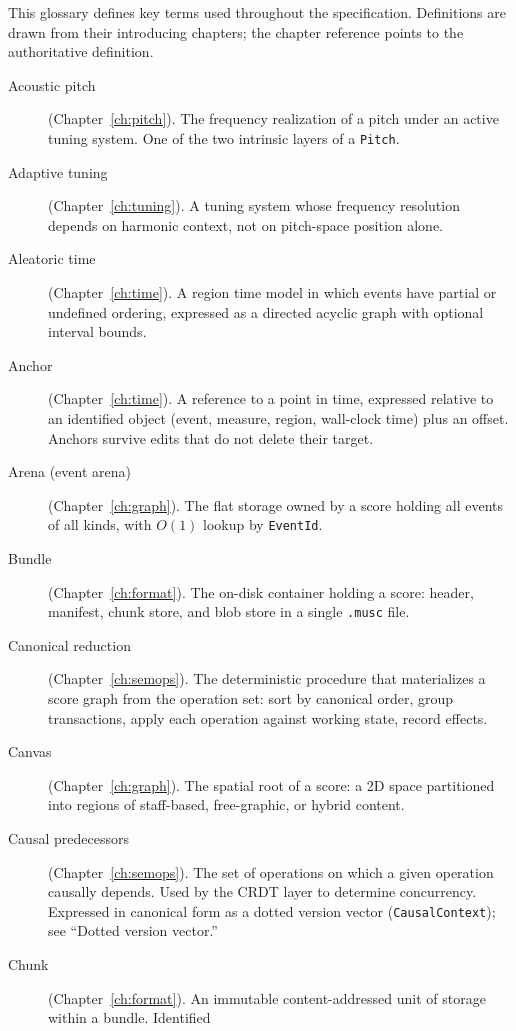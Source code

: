 \documentclass[11pt,letterpaper]{report}
\begin{document}
This glossary defines key terms used throughout the specification.
Definitions are drawn from their introducing chapters; the chapter
reference points to the authoritative definition.

\begin{description}
  \item[Acoustic pitch] (Chapter~\ref{ch:pitch}). The frequency
    realization of a pitch under an active tuning system. One of the
    two intrinsic layers of a \texttt{Pitch}.
  \item[Adaptive tuning] (Chapter~\ref{ch:tuning}). A tuning system
    whose frequency resolution depends on harmonic context, not on
    pitch-space position alone.
  \item[Aleatoric time] (Chapter~\ref{ch:time}). A region time model
    in which events have partial or undefined ordering, expressed
    as a directed acyclic graph with optional interval bounds.
  \item[Anchor] (Chapter~\ref{ch:time}). A reference to a point in
    time, expressed relative to an identified object (event,
    measure, region, wall-clock time) plus an offset. Anchors
    survive edits that do not delete their target.
  \item[Arena (event arena)] (Chapter~\ref{ch:graph}). The flat
    storage owned by a score holding all events of all kinds, with
    $O(1)$ lookup by \texttt{EventId}.
  \item[Bundle] (Chapter~\ref{ch:format}). The on-disk container
    holding a score: header, manifest, chunk store, and blob store
    in a single \texttt{.musc} file.
  \item[Canonical reduction] (Chapter~\ref{ch:semops}). The
    deterministic procedure that materializes a score graph from
    the operation set: sort by canonical order, group transactions,
    apply each operation against working state, record effects.
  \item[Canvas] (Chapter~\ref{ch:graph}). The spatial root of a
    score: a 2D space partitioned into regions of staff-based,
    free-graphic, or hybrid content.
  \item[Causal predecessors] (Chapter~\ref{ch:semops}). The set of
    operations on which a given operation causally depends. Used by
    the CRDT layer to determine concurrency. Expressed in canonical
    form as a dotted version vector
    (\texttt{CausalContext}); see ``Dotted version vector.''
  \item[Chunk] (Chapter~\ref{ch:format}). An immutable
    content-addressed unit of storage within a bundle. Identified

\end{description}
\end{document}
